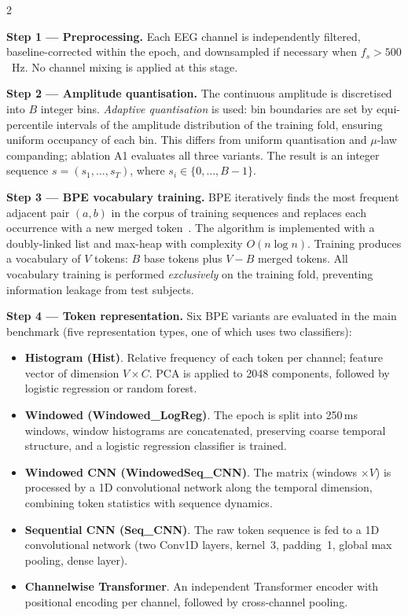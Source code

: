 \documentclass[14pt,a4paper]{extarticle}
\begin{document}
\begin{multicols}{2}

\textbf{Step 1 --- Preprocessing.}
Each EEG channel is independently filtered, baseline-corrected
within the epoch, and downsampled if necessary when $f_s > 500$~Hz.
No channel mixing is applied at this stage.

\textbf{Step 2 --- Amplitude quantisation.}
The continuous amplitude is discretised into $B$ integer bins.
\emph{Adaptive quantisation} is used: bin boundaries are set
by equi-percentile intervals of the amplitude distribution of
the training fold, ensuring uniform occupancy of each bin.
This differs from uniform quantisation and $\mu$-law companding;
ablation A1 evaluates all three variants.
The result is an integer sequence
$s = (s_1, \ldots, s_T)$, where $s_i \in \{0,\ldots,B{-}1\}$.

\textbf{Step 3 --- BPE vocabulary training.}
BPE iteratively finds the most frequent adjacent pair $(a, b)$
in the corpus of training sequences and replaces each occurrence
with a new merged token~\cite{sennrich2016bpe}.
The algorithm is implemented with a doubly-linked list and max-heap
with complexity $O(n \log n)$.
Training produces a vocabulary of $V$ tokens: $B$ base tokens plus
$V - B$ merged tokens.
All vocabulary training is performed \emph{exclusively} on the
training fold, preventing information leakage from test subjects.

\textbf{Step 4 --- Token representation.}
Six BPE variants are evaluated in the main benchmark
(five representation types, one of which uses two classifiers):
\begin{itemize}[leftmargin=*,itemsep=1pt]
  \item \textbf{Histogram (Hist)}. Relative frequency of each
    token per channel; feature vector of dimension $V \times C$.
    PCA is applied to 2048 components, followed by logistic regression
    or random forest.
  \item \textbf{Windowed (Windowed\_LogReg)}. The epoch
    is split into 250\,ms windows, window histograms are concatenated,
    preserving coarse temporal structure, and a logistic regression
    classifier is trained.
  \item \textbf{Windowed CNN (Windowed\-Seq\_CNN)}. The matrix
    (windows $\times V$) is processed by a 1D convolutional network
    along the temporal dimension, combining token statistics
    with sequence dynamics.
  \item \textbf{Sequential CNN (Seq\_CNN)}. The raw
    token sequence is fed to a 1D convolutional network
    (two Conv1D layers, kernel~3, padding~1, global max pooling,
    dense layer).
  \item \textbf{Channelwise Transformer}.
    An independent Transformer encoder with positional encoding
    per channel, followed by cross-channel pooling.
\end{itemize}


\end{multicols}
\end{document}
